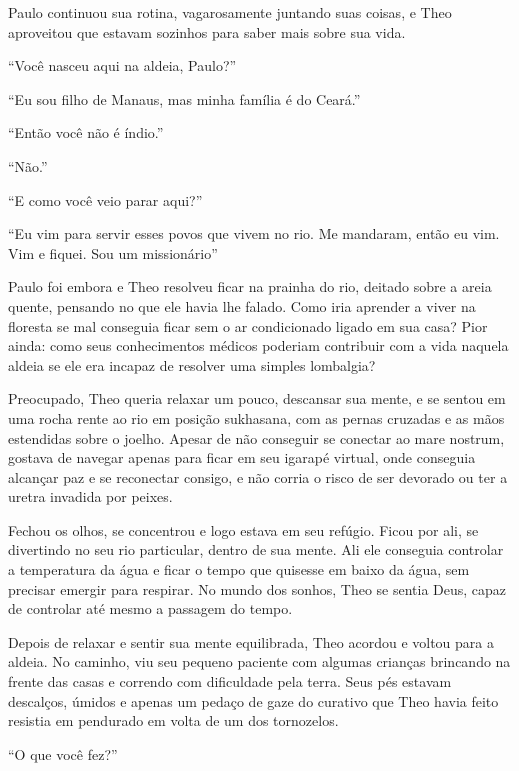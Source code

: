 Paulo continuou sua rotina, vagarosamente juntando suas coisas, e Theo
aproveitou que estavam sozinhos para saber mais sobre sua vida.

``Você nasceu aqui na aldeia, Paulo?''

``Eu sou filho de Manaus, mas minha família é do Ceará.''

``Então você não é índio.''

``Não.''

``E como você veio parar aqui?''

``Eu vim para servir esses povos que vivem no rio. Me mandaram, então eu
vim. Vim e fiquei. Sou um missionário''

\asterisc


Paulo foi embora e Theo resolveu ficar na prainha do rio, deitado sobre
a areia quente, pensando no que ele havia lhe falado. Como
iria aprender a viver na floresta se mal conseguia ficar sem o ar
condicionado ligado em sua casa? Pior ainda: como seus conhecimentos
médicos poderiam contribuir com a vida naquela aldeia se ele era incapaz
de resolver uma simples lombalgia?

Preocupado, Theo queria relaxar um pouco, descansar sua mente, e se
sentou em uma rocha rente ao rio em posição sukhasana, com as pernas
cruzadas e as mãos estendidas sobre o joelho. Apesar de não conseguir se
conectar ao mare nostrum, gostava de navegar apenas para ficar em seu
igarapé virtual, onde conseguia alcançar paz e se reconectar consigo, e
não corria o risco de ser devorado ou ter a uretra invadida por peixes.

Fechou os olhos, se concentrou e logo estava em seu refúgio. Ficou por
ali, se divertindo no seu rio particular, dentro de sua mente. Ali ele
conseguia controlar a temperatura da água e ficar o tempo que quisesse
em baixo da água, sem precisar emergir para respirar. No mundo dos
sonhos, Theo se sentia Deus, capaz de controlar até mesmo a passagem do
tempo.

Depois de relaxar e sentir sua mente equilibrada, Theo acordou e voltou
para a aldeia. No caminho, viu seu pequeno paciente com algumas crianças
brincando na frente das casas e correndo com dificuldade pela terra.
Seus pés estavam descalços, úmidos e apenas um pedaço de gaze do
curativo que Theo havia feito resistia em pendurado em volta de um dos
tornozelos.

``O que você fez?''

